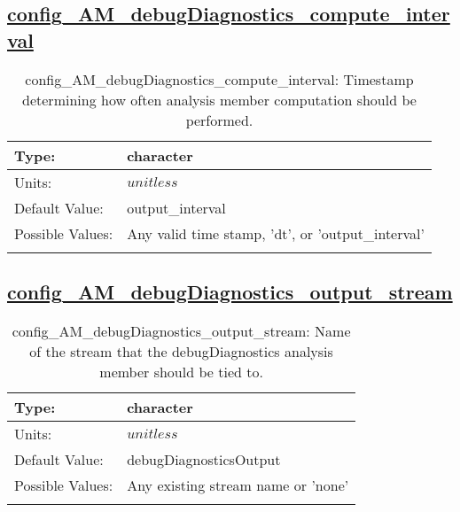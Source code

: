\subsection[config\_AM\_debugDiagnostics\_compute\_interval]{\hyperref[sec:nm_tab_AM_debugDiagnostics]{config\_AM\_debugDiagnostics\_compute\_interval}}
\label{subsec:nm_sec_config_AM_debugDiagnostics_compute_interval}
\begin{center}
\begin{longtable}{| p{2.0in} || p{4.0in} |}
    \hline
    Type: & character \\
    \hline
    Units: & $unitless$ \\
    \hline
    Default Value: & output\_interval \\
    \hline
    Possible Values: & Any valid time stamp, 'dt', or 'output\_interval' \\
    \hline
    \caption{config\_AM\_debugDiagnostics\_compute\_interval: Timestamp determining how often analysis member computation should be performed.}
\end{longtable}
\end{center}
\subsection[config\_AM\_debugDiagnostics\_output\_stream]{\hyperref[sec:nm_tab_AM_debugDiagnostics]{config\_AM\_debugDiagnostics\_output\_stream}}
\label{subsec:nm_sec_config_AM_debugDiagnostics_output_stream}
\begin{center}
\begin{longtable}{| p{2.0in} || p{4.0in} |}
    \hline
    Type: & character \\
    \hline
    Units: & $unitless$ \\
    \hline
    Default Value: & debugDiagnosticsOutput \\
    \hline
    Possible Values: & Any existing stream name or 'none' \\
    \hline
    \caption{config\_AM\_debugDiagnostics\_output\_stream: Name of the stream that the debugDiagnostics analysis member should be tied to.}
\end{longtable}
\end{center}
